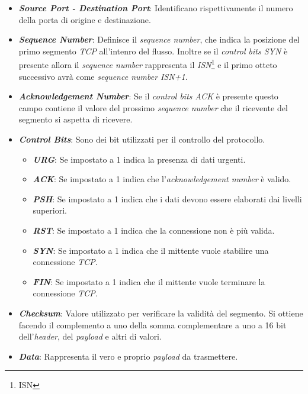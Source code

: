 \begin{itemize}
\item \textit{\textbf{Source Port - Destination Port}}: Identificano rispettivamente il numero della porta di origine e destinazione.
\item \textit{\textbf{Sequence Number}}: Definisce il \emph{sequence number}, che indica la posizione del primo segmento \emph{TCP} all'intenro del flusso. Inoltre se il \emph{control bits SYN} è presente allora il \emph{sequence number} rappresenta il \emph{ISN}\footnote{\gls{ISN}} e il primo otteto successivo avrà come \emph{sequence number ISN+1}.
\item \textit{\textbf{Acknowledgement Number}}: Se il \emph{control bits ACK} è presente questo campo contiene il valore del prossimo \emph{sequence number} che il ricevente del segmento si aspetta di ricevere.
\item \textit{\textbf{Control Bits}}: Sono dei bit utilizzati per il controllo del protocollo. 
\begin{itemize}
    \item \textit{\textbf{URG}}: Se impostato a 1 indica la presenza di dati urgenti.
    \item \textit{\textbf{ACK}}: Se impostato a 1 indica che l'\emph{acknowledgement number} è valido.
    \item \textit{\textbf{PSH}}: Se impostato a 1 indica che i dati devono essere elaborati dai livelli superiori.
    \item \textit{\textbf{RST}}: Se impostato a 1 indica che la connessione non è più valida.
    \item \textit{\textbf{SYN}}: Se impostato a 1 indica che il mittente vuole stabilire una connessione \emph{TCP}.
    \item \textit{\textbf{FIN}}: Se impostato a 1 indica che il mittente vuole terminare la connessione \emph{TCP}.
\end{itemize}
\item \textit{\textbf{Checksum}}: Valore utilizzato per verificare la validità del segmento. Si ottiene facendo il complemento a uno della somma complementare a uno a 16 bit dell'\emph{header}, del \emph{payload} e altri di valori.
\item \textit{\textbf{Data}}: Rappresenta il vero e proprio \emph{payload} da trasmettere.
\end{itemize}

